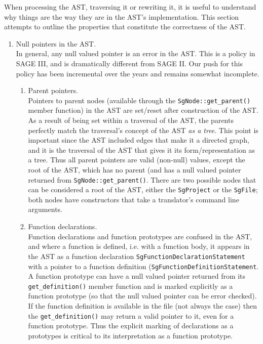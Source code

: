     When processing the AST, traversing it or rewriting it, it is useful to understand
why things are the way they are in the AST's implementation.  This section attempts to 
outline the properties that constitute the correctness of the AST.
\begin{enumerate}
     \item Null pointers in the AST. \\
          In general, any null valued pointer is an error in the AST.  This is 
          a policy in SAGE III, and is dramatically different from SAGE II.
          Our push for this policy has been incremental over the years and remains
          somewhat incomplete.
     \begin{enumerate}
          \item Parent pointers. \\
               Pointers to parent nodes (available through the {\tt SgNode::get\_parent()} member
               function) in the AST are set/reset after construction of the AST. As a
               result of being set within a traversal of the AST, the parents perfectly 
               match the traversal's concept of the AST {\em as a tree}.  This point is
               important since the AST included edges that make it a directed graph, and
               it is the traversal of the AST 
               that gives it its form/representation as a tree.  Thus all parent pointers
               are valid (non-null) values, except the root of the AST, which has no
               parent (and has a null valued pointer returned from 
               {\tt SgNode::get\_parent()}.  There are two possible nodes that can be
               considered a root of the AST, either the {\tt SgProject} or the 
               {\tt SgFile}; both nodes have constructors that take a translator's command
               line arguments.

          \item Function declarations. \\
               Function declarations and function prototypes are confused in the AST,
               and where a function is defined, i.e. with a function body, it appears 
               in the AST as a function declaration {\tt SgFunctionDeclarationStatement} 
               with a pointer to a function definition 
               ({\tt SgFunctionDefinitionStatement}. A function prototype can have a null 
               valued pointer returned from its {\tt get\_definition()} member function
               and is marked explicitly as a function prototype (so that the null valued
               pointer can be error checked). If the function definition is available
               in the file (not always the case) then the {\tt get\_definition()} may 
               return a valid pointer 
               to it, even for a function prototype. Thus the explicit marking of
               declarations as a prototypes is critical to its interpretation as a function
               prototype.


\end{enumerate}
\end{enumerate}
